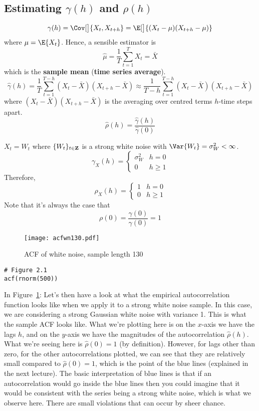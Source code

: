 \subsection*{Estimating $ \gamma(h) $ and $ \rho(h) $}
\[ \gamma(h)=\Cov[\big]{X_t,X_{t+h}}=\E[\big]{(X_t-\mu)(X_{t+h}-\mu)} \]
where $ \mu=\E{X_t} $. Hence, a sensible estimator is
\[ \hat{\mu}=\frac{1}{T} \sum_{t=1}^{T} X_t=\bar{X} \]
which is the \textbf{sample mean} (\textbf{time series average}).
\[ \hat{\gamma}(h)=\frac{1}{T} \sum_{t=1}^{T-h}(X_t-\bar{X})(X_{t+h}-\bar{X})
    \approx \frac{1}{T-h} \sum_{t=1}^{T-h}(X_t-\bar{X})(X_{t+h}-\bar{X})  \]
where $ (X_t-\bar{X})(X_{t+h}-\bar{X}) $ is the averaging over
centred terms $ h $-time steps apart.
\[ \hat{\rho}(h)=\frac{\hat{\gamma}(h)}{\hat{\gamma}(0)}  \]
\begin{Example}{}{}
    $ X_t=W_t $ where $ \{W_t\}_{t\in\mathbf{Z}} $ is a strong white noise
    with $ \Var{W_t}=\sigma_W^2<\infty $.
    \[ \gamma_X(h)=\begin{cases}
            \sigma_W^2 & h=0    \\
            0          & h\ge 1
        \end{cases} \]
    Therefore,
    \[ \rho_X(h)=\begin{cases}
            1 & h=0    \\
            0 & h\ge 1
        \end{cases} \]
    Note that it's always the case that
    \[ \rho(0)=\frac{\gamma(0)}{\gamma(0)}=1  \]
\end{Example}
\begin{figure}[!htbp]
    \centering
    \texttt{[image: acfwn130.pdf]}
    \caption{ACF of white noise, sample length 130}\label{fig:acfwn130}
\end{figure}
\begin{verbatim}
# Figure 2.1
acf(rnorm(500))
\end{verbatim}
In Figure~\ref{fig:acfwn130}:
{\color{blue}Let's then have a look at what the empirical autocorrelation
function looks like when we apply it to a strong white noise sample.
In this case, we are considering a strong Gaussian white noise
with variance 1. This is what the sample ACF looks like.
What we're plotting here is on the $ x $-axis we have the lags $ h $,
and on the $ y $-axis we have the magnitudes of the autocorrelation $ \hat{\rho}(h) $.
What we're seeing here
is $ \hat{\rho}(0)=1 $ (by definition). However, for lags other than zero,
for the other autocorrelations plotted, we can see that they are
relatively small compared to $ \hat{\rho}(0)=1 $,
which is the point of the blue lines (explained
in the next lecture). The basic interpretation of blue lines is that
if an autocorrelation would go inside the blue lines then you could imagine
that it would be consistent with the series being a strong white noise,
which is what we observe here. There are small violations that can occur by
sheer chance.}

